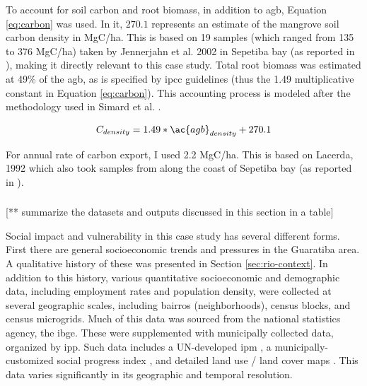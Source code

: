 To account for soil carbon and root biomass, in addition to \ac{agb}, Equation \ref{eq:carbon} was used. In it, $270.1$ represents an estimate of the mangrove soil carbon density in MgC/ha. This is based on 19 samples (which ranged from 135 to 376 MgC/ha) taken by Jennerjahn et al. 2002 \cite{jennerjahnRelevanceMangrovesProduction2002} in Sepetiba bay (as reported in \cite{kristensenOrganicCarbonDynamics2008, atwoodGlobalPatternsMangrove2017}), making it directly relevant to this case study.  Total root biomass was estimated at 49\% of the \ac{agb}, as is specified by \ac{ipcc} guidelines \cite{takahiko2013Supplement20062014} (thus the 1.49 multiplicative constant in Equation \ref{eq:carbon}). This accounting process is modeled after the methodology used in Simard et al. \cite{simardMangroveCanopyHeight2019}.

\begin{equation}
\label{eq:carbon}
C_{density} = 1.49 * \ac{agb}_{density} + 270.1 
\end{equation}

For annual rate of carbon export, I used 2.2 MgC/ha. This is based on Lacerda, 1992 which also took samples from along the coast of Sepetiba bay \cite{lacerda1992carbon} (as reported in \cite{jennerjahnRelevanceMangrovesProduction2002}).


\subsubsection{} \label{sec:rio-vulnerability}

[** summarize the datasets and outputs discussed in this section in a table]

Social impact and vulnerability in this case study has several different forms. First there are general socioeconomic trends and pressures in the Guaratiba area. A qualitative history of these was presented in Section \ref{sec:rio-context}. In addition to this history, various quantitative socioeconomic and demographic data, including employment rates and population density, were collected at several geographic scales, including bairros (neighborhoods), census blocks, and census microgrids. Much of this data was sourced from the national statistics agency, the \ac{ibge}. These were supplemented with municipally collected data, organized by \ac{ipp}. Such data includes a UN-developed \ac{ipm} \cite{oxfordpovertyandhumandevelopmentinitiativeChartingPathewaysOut2020}, a municipally-customized social progress index \cite{puliciRelatorioMetodologicoIndice2016}, and detailed land use / land cover maps \cite{regoAutomaticClassificationLand2003}. This data varies significantly in its geographic and temporal resolution. 

